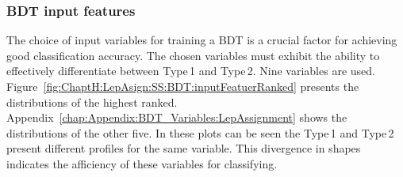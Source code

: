  
\subsubsection{BDT input features}
\label{sec:ChaptH:Sig:LepAsign:SS:BDT:inputFeatues}
The choice of input variables for training a BDT is a crucial factor for achieving good classification accuracy.
The chosen variables must exhibit the ability to effectively differentiate between Type$\,$1 and Type$\,$2. 
Nine variables are used. Figure~\ref{fig:ChaptH:LepAsign:SS:BDT:inputFeatuerRanked} presents
the distributions of the highest ranked.
Appendix~\ref{chap:Appendix:BDT_Variables:LepAssignment} shows
the distributions of the other five. In these plots can be seen 
the Type$\,$1 and Type$\,$2 present different profiles for the same variable.
This divergence in shapes indicates the afficiency of these variables for classifying.

